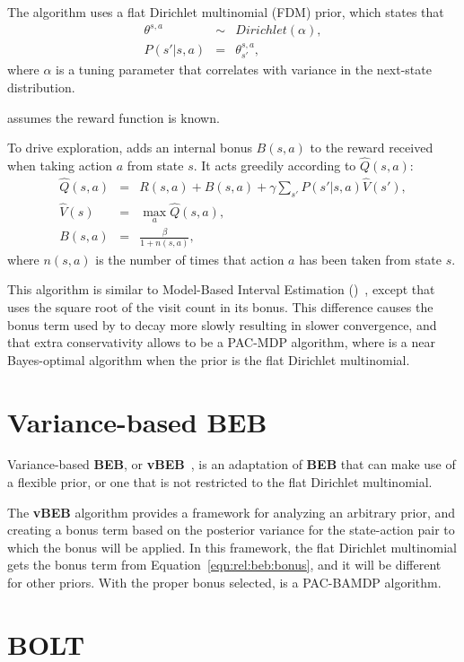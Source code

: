 The algorithm uses a flat Dirichlet multinomial (FDM) prior, which states that
\begin{eqnarray}
\theta^{s,a}&\sim&Dirichlet(\alpha),\\
P(s'|s,a)&=&\theta^{s,a}_{s'},
\end{eqnarray}
where $\alpha$ is a tuning parameter that correlates with variance in the next-state distribution.

 assumes the reward function is known.

To drive exploration,  adds an internal bonus $B(s,a)$ to the reward received when taking action $a$ from state $s$. It acts greedily according to $\hat Q(s,a)$:
\begin{eqnarray}
\hat Q(s,a)&=&R(s,a)+B(s,a)+\gamma \sum_{s'} P(s'|s,a)\hat V(s'),\\
\hat V(s)&=& \max_a \hat Q(s, a),\\
\label{eqn:rel:beb:bonus}
B(s,a)&=&\frac\beta{1+n(s,a)},
\end{eqnarray}
where $n(s,a)$ is the number of times that action $a$ has been taken from state $s$.

This algorithm is similar to Model-Based Interval Estimation ()~\cite{strehl06}, except that  uses the square root of the visit count in its bonus. This difference causes the bonus term used by  to decay more slowly resulting in slower convergence, and that extra conservativity allows  to be a PAC-MDP algorithm, where  is a near Bayes-optimal algorithm when the prior is the flat Dirichlet multinomial.

\section{Variance-based BEB}

Variance-based {\bf BEB}, or {\bf vBEB}~\cite{sorg10}, is an adaptation of {\bf BEB} that can make use of a flexible prior, or one that is not restricted to the flat Dirichlet multinomial.

The {\bf vBEB} algorithm provides a framework for analyzing an arbitrary prior, and creating a bonus term based on the posterior variance for the state-action pair to which the bonus will be applied. In this framework, the flat Dirichlet multinomial gets the bonus term from Equation~\ref{eqn:rel:beb:bonus}, and it will be different for other priors. With the proper bonus selected,  is a PAC-BAMDP algorithm.

\section{BOLT}

